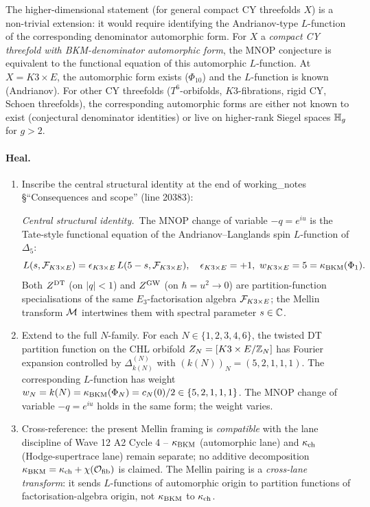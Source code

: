 The higher-dimensional statement (for general compact CY
threefolds $X$) is a non-trivial extension: it would require
identifying the Andrianov-type $L$-function of the corresponding
denominator automorphic form. For $X$ a \emph{compact CY threefold
with BKM-denominator automorphic form}, the MNOP conjecture is
equivalent to the functional equation of this automorphic
$L$-function. At $X=K3\times E$, the automorphic form exists
($\Phi_{10}$) and the $L$-function is known (Andrianov). For
other CY threefolds ($T^6$-orbifolds, $K3$-fibrations, rigid
CY, Schoen threefolds), the corresponding automorphic forms are
either not known to exist (conjectural denominator identities)
or live on higher-rank Siegel spaces $\mathbb{H}_g$ for $g>2$.

\paragraph{Heal.}
\begin{enumerate}[label=(H\arabic*),leftmargin=1.5em]
\item Inscribe the central structural identity at the end of
  working\_notes \S ``Consequences and scope'' (line 20383):

\medskip
\noindent\emph{Central structural identity.}\ The MNOP change of
variable $-q=e^{iu}$ is the Tate-style functional equation of
the Andrianov--Langlands spin $L$-function of $\Delta_5$:
\[
L(s,\mathcal{F}_{K3\times E})=\epsilon_{K3\times E}\,L(5-s,\mathcal{F}_{K3\times E}),
\quad \epsilon_{K3\times E}=+1,\ w_{K3\times E}=5=\kappa_{\mathrm{BKM}}(\Phi_1).
\]
Both $Z^{\mathrm{DT}}$ (on $|q|<1$) and $Z^{\mathrm{GW}}$ (on $\hbar=u^2\to 0$)
are partition-function specialisations of the same
$E_3$-factorisation algebra $\mathcal{F}_{K3\times E}$; the Mellin
transform $\mathcal{M}$ intertwines them with spectral parameter
$s\in\mathbb{C}$.

\item Extend to the full $N$-family. For each
  $N\in\{1,2,3,4,6\}$, the twisted DT partition function on the
  CHL orbifold $Z_N=[K3\times E/\mathbb{Z}_N]$ has Fourier expansion
  controlled by $\Delta^{(N)}_{k(N)}$ with
  $(k(N))_N=(5,2,1,1,1)$. The corresponding $L$-function has
  weight $w_N=k(N)=\kappa_{\mathrm{BKM}}(\Phi_N)=c_N(0)/2\in\{5,2,1,1,1\}$.
  The MNOP change of variable
  $-q=e^{iu}$ holds in the same form; the weight varies.

\item Cross-reference: the present Mellin framing is
  \emph{compatible} with the lane discipline of Wave 12 A2 Cycle
  4 -- $\kappa_{\mathrm{BKM}}$ (automorphic lane) and $\kappa_{\mathrm{ch}}$ (Hodge-supertrace
  lane) remain separate; no additive decomposition
  $\kappa_{\mathrm{BKM}}=\kappa_{\mathrm{ch}}+\chi(\mathcal{O}_{\mathrm{fib}})$ is claimed. The Mellin
  pairing is a \emph{cross-lane transform}: it sends
  $L$-functions of automorphic origin to partition functions of
  factorisation-algebra origin, not $\kappa_{\mathrm{BKM}}$ to $\kappa_{\mathrm{ch}}$.
\end{enumerate}

